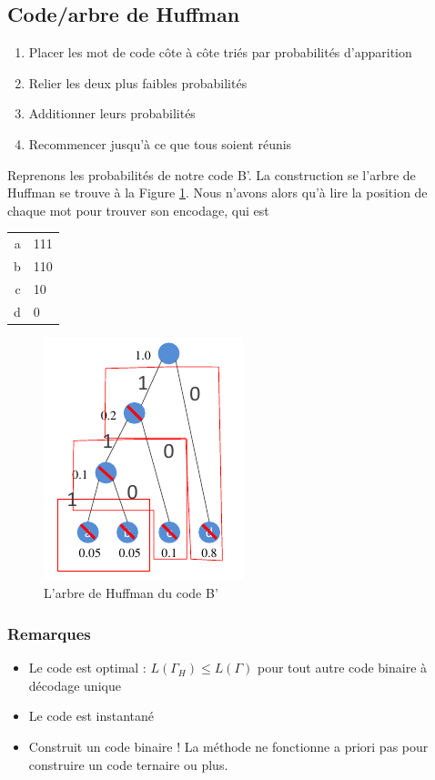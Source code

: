 \documentclass[11pt,a4paper]{article}
\renewcommand{\)}{\right)}
\renewcommand{\(}{\left(}
\begin{document}
\subsection{Code/arbre de Huffman}
\label{code huffman}
 \begin{enumerate}
	\item Placer les mot de code côte à côte triés par probabilités d'apparition
	\item Relier les deux plus faibles probabilités
	\item Additionner leurs probabilités
	\item Recommencer jusqu'à ce que tous soient réunis
\end{enumerate}
\begin{exemple}[0.85]
 	Reprenons les probabilités de notre code B'. La construction se l'arbre de Huffman se trouve à la Figure \ref{arbre huffman bprime}. Nous n'avons alors qu'à lire la position de chaque mot pour trouver son encodage, qui est
 	\begin{tabular}{r|l}
 	\hline
 	a & 111\\
 	b & 110\\
 	c & 10\\
 	d & 0\\
 	\hline
 	\end{tabular}
\end{exemple}
 \begin{figure}[!h]
 	\centering
 	\includegraphics[scale=0.6]{images/arbre_Huffman}
 	\caption{L'arbre de Huffman du code B'}
  	\label{arbre huffman bprime}
 \end{figure}
 
\subsubsection{Remarques} 
\begin{itemize}
	\item 	Le code est optimal : $L(\Gamma_H) \leq L(\Gamma)$ pour tout autre code binaire à décodage unique
	\item 	Le code est instantané
	\item 	Construit un code binaire ! La méthode ne fonctionne a priori pas pour construire un code ternaire ou plus.
\end{itemize} 
\end{document}
